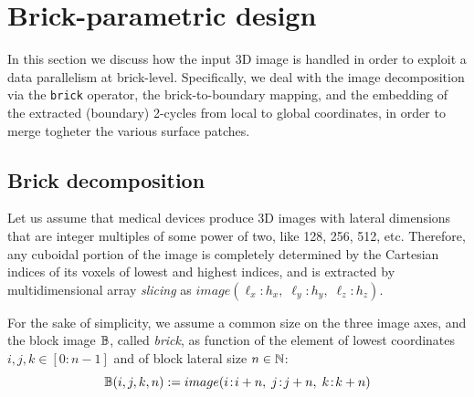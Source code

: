 
\section{Brick-parametric design}\label{sec:filter}

In this section we discuss how the input 3D image is handled in order to exploit a data parallelism at brick-level. Specifically, we deal with the image decomposition via the \texttt{brick} operator, the brick-to-boundary mapping, and the embedding of the extracted (boundary) 2-cycles from local to global coordinates, in order to merge togheter the various surface patches.

\subsection{Brick decomposition}\label{sec:brick-decomposition}

Let us assume that medical devices produce 3D images with lateral dimensions that are integer multiples of some power of two, like 128, 256, 512, etc.
Therefore, any cuboidal portion of the image is completely determined by the Cartesian indices of its voxels of lowest and highest indices, and is extracted by multidimensional array \emph{slicing} as $image(\ell_x \!:\! h_x,\; \ell_y \!:\! h_y,\; \ell_z \!:\! h_z)$.

For the sake of simplicity, we assume a common size on the three image axes, and the block image $\mathbb{B}$, called \emph{brick}, as function of the element of lowest coordinates $i,j,k\in [0 \!:\! n-1]$ and of block lateral size $n\in\mathbb{N}$:
\[
\mathbb{B}(i,j,k,n) := image(i \!:\! i+n,\; j \!:\! j+n,\; k \!:\! k+n) 
\]


